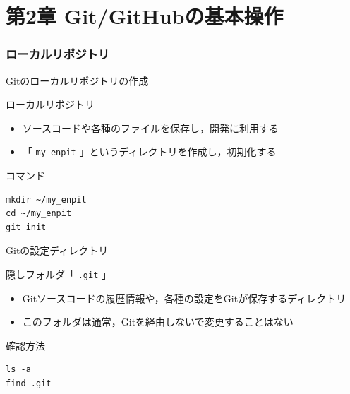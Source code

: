 \documentclass[t, aspectratio=169]{beamer}
\begin{document}
\part{第2章 Git/GitHubの基本操作}
\label{sec-2}
\section{ローカルリポジトリ}
\label{sec-2-1}
\begin{frame}[fragile,label=sec-2-1-1]{Gitのローカルリポジトリの作成}
 \begin{block}{ローカルリポジトリ}
\begin{itemize}
\item ソースコードや各種のファイルを保存し，開発に利用する
\item 「 \texttt{my\_enpit} 」というディレクトリを作成し，初期化する
\end{itemize}
\end{block}

\begin{block}{コマンド}
\begin{verbatim}
mkdir ~/my_enpit
cd ~/my_enpit
git init
\end{verbatim}
\end{block}
\end{frame}
\begin{frame}[fragile,label=sec-2-1-2]{Gitの設定ディレクトリ}
 \begin{block}{隠しフォルダ「 \texttt{.git} 」}
\begin{itemize}
\item Gitソースコードの履歴情報や，各種の設定をGitが保存するディレクトリ
\item このフォルダは通常，Gitを経由しないで変更することはない
\end{itemize}
\end{block}

\begin{block}{確認方法}
\begin{verbatim}
ls -a
find .git
\end{verbatim}
\end{block}
\end{frame}
\end{document}
